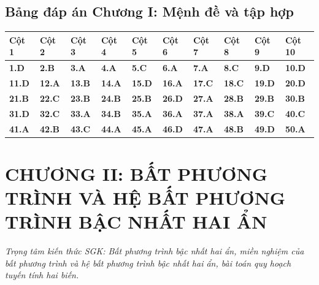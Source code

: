 \documentclass[11pt,a4paper]{article}
\begin{document}
\subsection*{\color{primary} Bảng đáp án Chương I: Mệnh đề và tập hợp}
\begin{center}
\renewcommand{\arraystretch}{1.25}
\begin{tabularx}{\textwidth}{*{10}{>{\centering\arraybackslash}X}}
\toprule
\textbf{\color{primary} Cột 1} & \textbf{\color{primary} Cột 2} & \textbf{\color{primary} Cột 3} & \textbf{\color{primary} Cột 4} & \textbf{\color{primary} Cột 5} & \textbf{\color{primary} Cột 6} & \textbf{\color{primary} Cột 7} & \textbf{\color{primary} Cột 8} & \textbf{\color{primary} Cột 9} & \textbf{\color{primary} Cột 10} \\
\midrule
\textbf{1.D} & \textbf{2.B} & \textbf{3.A} & \textbf{4.A} & \textbf{5.C} & \textbf{6.A} & \textbf{7.A} & \textbf{8.C} & \textbf{9.D} & \textbf{10.D} \\
\rowcolor{rowtint} \textbf{11.D} & \textbf{12.A} & \textbf{13.B} & \textbf{14.A} & \textbf{15.D} & \textbf{16.A} & \textbf{17.C} & \textbf{18.C} & \textbf{19.D} & \textbf{20.D} \\
\textbf{21.B} & \textbf{22.C} & \textbf{23.B} & \textbf{24.B} & \textbf{25.B} & \textbf{26.D} & \textbf{27.A} & \textbf{28.B} & \textbf{29.B} & \textbf{30.B} \\
\rowcolor{rowtint} \textbf{31.D} & \textbf{32.C} & \textbf{33.A} & \textbf{34.B} & \textbf{35.A} & \textbf{36.A} & \textbf{37.A} & \textbf{38.A} & \textbf{39.C} & \textbf{40.C} \\
\textbf{41.A} & \textbf{42.B} & \textbf{43.C} & \textbf{44.A} & \textbf{45.A} & \textbf{46.D} & \textbf{47.A} & \textbf{48.B} & \textbf{49.D} & \textbf{50.A} \\
\bottomrule
\end{tabularx}
\end{center}\vspace{10pt}
\section*{\color{primary} CHƯƠNG II: BẤT PHƯƠNG TRÌNH VÀ HỆ BẤT PHƯƠNG TRÌNH BẬC NHẤT HAI ẨN}
\textit{Trọng tâm kiến thức SGK: Bất phương trình bậc nhất hai ẩn, miền nghiệm của bất phương trình và hệ bất phương trình bậc nhất hai ẩn, bài toán quy hoạch tuyến tính hai biến.}\par\vspace{4pt}
\end{document}
